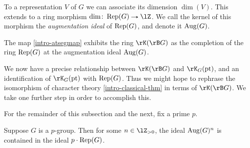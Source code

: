 \begin{definition}
  \label{intro-aug}
  To a representation $V$ of $G$ we can associate its dimension
  $\dim(V)$. This extends to a ring morphism
  $\dim \c \Rep(G) \to \lZ$. We call the kernel of this morphism the
  \emph{augmentation ideal} of $\operatorname{Rep}(G)$, and denote it $\operatorname{Aug}(G)$.
\end{definition}

\begin{theorem}
  \label{intro-atseg}
  The map \cref{intro-atsegmap} exhibits the ring $\rK(\rB G)$ as the
  completion of the ring $\operatorname{Rep}(G)$ at the augmentation ideal
  $\operatorname{Aug}(G)$.
\end{theorem}

We now have a precise relationship between $\rK(\rB G)$ and
$\rK_G(\pt)$, and an identification of $\rK_G(\pt)$ with
$\operatorname{Rep}(G)$. Thus we might hope to rephrase the isomorphism of character
theory \cref{intro-classical-thm} in terms of $\rK(\rB G)$. We take
one further step in order to accomplish this.

\begin{notation}
  \label{intro-fixp}
  For the remainder of this subsection and the next, fix a prime $p$.
\end{notation}

\begin{lemma}
  \label{intro-ideals}
  Suppose $G$ is a $p$-group. Then for some $n \in \lZ_{> 0}$, the
  ideal $\operatorname{Aug}(G)^n$ is contained in the ideal $p \cdot \operatorname{Rep}(G)$.
\end{lemma}

